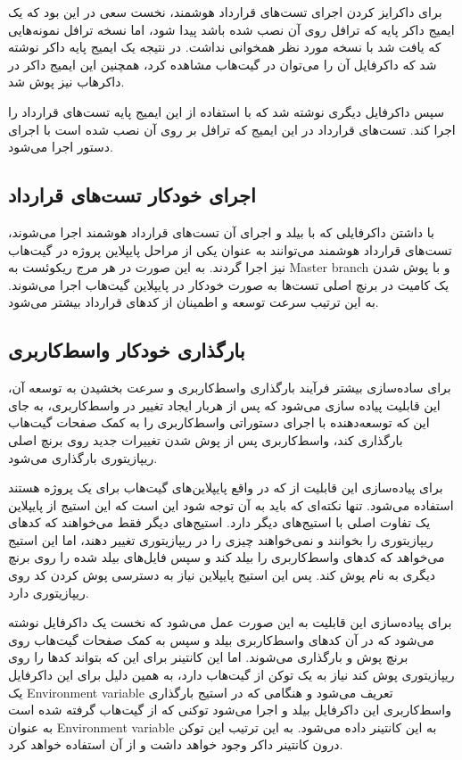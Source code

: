 برای داکرایز کردن اجرای تست‌های قرارداد هوشمند،
نخست سعی در این بود که یک ایمیج داکر پایه که ترافل روی آن نصب شده باشد پیدا شود،
اما نسخه ترافل نمونه‌هایی که یافت شد با نسخه مورد نظر همخوانی نداشت.
در نتیجه یک ایمیج پایه داکر نوشته شد که داکرفایل آن را می‌توان در گیت‌هاب
مشاهده کرد، همچنین این ایمیج داکر در داکرهاب
نیز پوش شد.

سپس داکرفایل دیگری نوشته شد که با استفاده از این ایمیج پایه تست‌های قرارداد را اجرا کند.
تست‌های قرارداد در این ایمیج که ترافل بر روی آن نصب شده است با اجرای دستور
اجرا می‌شود.


\subsection{اجرای خودکار تست‌های قرارداد}
با داشتن داکرفایلی که با بیلد و اجرای آن تست‌های قرارداد هوشمند اجرا می‌شوند،
تست‌های قرارداد هوشمند می‌توانند به عنوان یکی از مراحل پایپلاین پروژه در گیت‌هاب نیز اجرا گردند.
به این صورت در هر مرج ریکوئست به
\gls{Master branch}
و با پوش شدن یک کامیت در برنچ اصلی تست‌ها به صورت خودکار در پایپلاین گیت‌هاب اجرا می‌شوند.
به این ترتیب سرعت توسعه و اطمینان از کدهای قرارداد بیشتر می‌شود.


\subsection{بارگذاری خودکار واسط‌کاربری}
برای ساده‌سازی بیشتر فرآیند بارگذاری واسط‌کاربری و سرعت بخشیدن به توسعه آن،
این قابلیت پیاده سازی می‌شود که پس از هربار ایجاد تغییر در واسط‌کاربری،
به جای این که توسعه‌دهنده با اجرای دستوراتی واسط‌کاربری را به کمک صفحات گیت‌هاب بارگذاری کند،
واسط‌کاربری پس از پوش شدن تغییرات جدید روی برنچ اصلی ریپازیتوری بارگذاری می‌شود.

برای پیاده‌سازی این قابلیت از
که در واقع پایپلاین‌های گیت‌هاب برای یک پروژه هستند استفاده می‌شود.
تنها نکته‌ای که باید به آن توجه شود این است که این استیج از پایپلاین یک تفاوت اصلی با استیج‌های دیگر دارد.
استیج‌های دیگر فقط می‌خواهند که کدهای ریپازیتوری را بخوانند و نمی‌خواهند چیزی را در ریپازیتوری تغییر دهند،
اما این استیج می‌خواهد که کد‌های واسط‌کاربری را بیلد کند و سپس فایل‌های بیلد شده را روی برنچ دیگری به نام
پوش کند. پس این استیج پایپلاین نیاز به دسترسی پوش کردن کد روی ریپازیتوری دارد.

برای پیاده‌سازی این قابلیت به این صورت عمل می‌شود که نخست یک داکرفایل نوشته می‌شود
که در آن کدهای واسط‌کاربری بیلد و سپس به کمک صفحات گیت‌هاب روی برنچ
پوش و بارگذاری می‌شوند.
اما این کانتینر برای این که بتواند کدها را روی ریپازیتوری پوش کند نیاز به یک توکن از گیت‌هاب دارد،
به همین دلیل برای این داکرفایل یک
\gls{Environment variable}
تعریف می‌شود و هنگامی که در استیج بارگذاری واسط‌کاربری این داکرفایل بیلد
و اجرا می‌شود توکنی که از گیت‌هاب گرفته شده است به عنوان
\gls{Environment variable}
به این کانتینر داده می‌شود. به این ترتیب این توکن درون کانتینر داکر وجود خواهد داشت و
از آن استفاده خواهد کرد.

